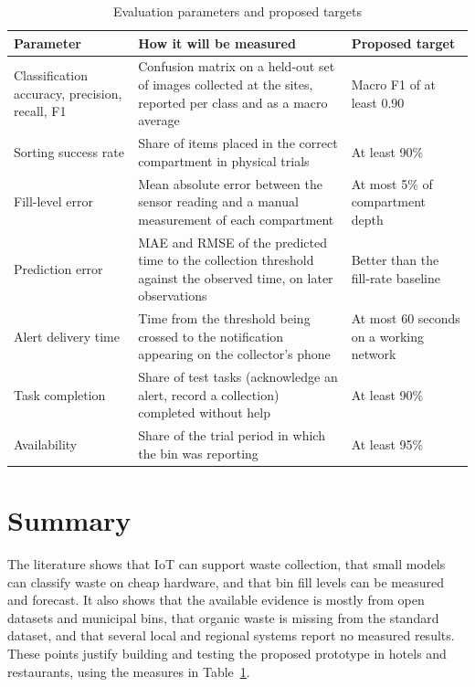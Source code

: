 \documentclass[12pt,a4paper]{report}
\begin{document}
\begin{table}[htbp]
\centering
\small
\renewcommand{\arraystretch}{1.25}
\begin{tabular}{>{\raggedright\arraybackslash}p{3.0cm}>{\raggedright\arraybackslash}p{5.4cm}>{\raggedright\arraybackslash}p{3.5cm}}
\hline
\textbf{Parameter} & \textbf{How it will be measured} & \textbf{Proposed target}\\
\hline
Classification accuracy, precision, recall, F1 & Confusion matrix on a held-out set of images collected at the sites, reported per class and as a macro average & Macro F1 of at least 0.90\\
Sorting success rate & Share of items placed in the correct compartment in physical trials & At least 90\%\\
Fill-level error & Mean absolute error between the sensor reading and a manual measurement of each compartment & At most 5\% of compartment depth\\
Prediction error & MAE and RMSE of the predicted time to the collection threshold against the observed time, on later observations & Better than the fill-rate baseline\\
Alert delivery time & Time from the threshold being crossed to the notification appearing on the collector's phone & At most 60 seconds on a working network\\
Task completion & Share of test tasks (acknowledge an alert, record a collection) completed without help & At least 90\%\\
Availability & Share of the trial period in which the bin was reporting & At least 95\%\\
\hline
\end{tabular}
\caption{Evaluation parameters and proposed targets}
\label{tab:params}
\end{table}

\section{Summary}

The literature shows that IoT can support waste collection, that small models can classify waste on cheap hardware, and that bin fill levels can be measured and forecast. It also shows that the available evidence is mostly from open datasets and municipal bins, that organic waste is missing from the standard dataset, and that several local and regional systems report no measured results. These points justify building and testing the proposed prototype in hotels and restaurants, using the measures in Table~\ref{tab:params}.
\end{document}
